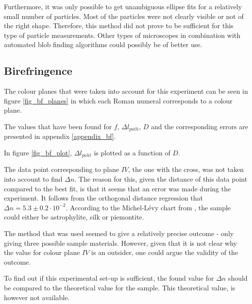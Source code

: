 Furthermore, it was only possible to get unambiguous ellipse fits for a relatively small number of particles. Most of the particles were not clearly visible or not of the right shape. Therefore, this method did not prove to be sufficient for this type of particle measurements. Other types of microscopes in combination with automated blob finding algorithms could possibly be of better use.

\subsection{Birefringence}

The colour planes that were taken into account for this experiment can be seen in figure \ref{fig_bf_planes} in which each Roman numeral corresponds to a colour plane.

The values that have been found for $f$, $\Delta l_{path}$, $D$ and the corresponding errors are presented in appendix \ref{appendix_bf}.

In figure \ref{fig_bf_plot}, $\Delta l_{paht}$ is plotted as a function of $D$.

The data point corresponding to plane $IV$, the one with the cross, was not taken into account to find $\Delta n$. The reason for this, given the distance of this data point compared to the best fit, is that it seems that an error was made during the experiment.
It follows from the orthogonal distance regression that $\Delta n = 5.3 \pm 0.2 \cdot 10^{-2}$. According to the Michel-L\'evy chart from \cite{bf_chart}, the sample could either be astrophylite, silk or piemontite. 

The method that was used seemed to give a relatively precise outcome - only giving three possible sample materials. However, given that it is not clear why the value for colour plane $IV$ is an outsider, one could argue the validity of the outcome.

To find out if this experimental set-up is sufficient, the found value for $\Delta n$ should be compared to the theoretical value for the sample. This theoretical value, is however not available. 


